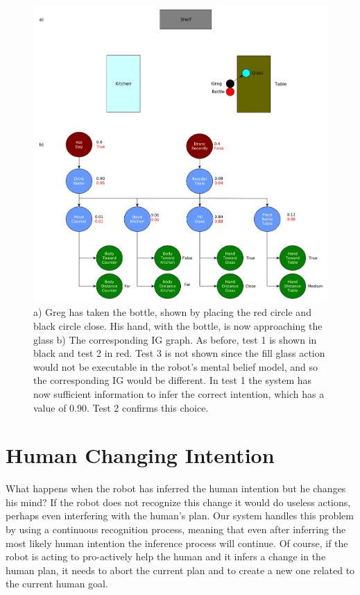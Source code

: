 \clearpage
 \begin{figure}[ht!]
	\centering
	\includegraphics[scale=0.4]{img/observer/ig_exp3.pdf}
	\caption[IG Example 3]{a) Greg has taken the bottle, shown by placing the red circle and black circle close. His hand, with the bottle, is now approaching the glass b) The corresponding IG graph. As before, test 1 is shown in black and test 2 in red. Test 3 is not shown since the fill glass action would not be executable in the robot's mental belief model, and so the corresponding IG would be different. In test 1 the system has now sufficient information to infer the correct intention, which has a value of 0.90. Test 2 confirms this choice.}
	\label{fig:intention-ig_exp3}
\end{figure}
\clearpage

\section{Human Changing Intention}
What happens when the robot has inferred the human intention but he changes his mind? If the robot does not recognize this change it would do useless actions, perhaps even interfering with the human's plan. Our system handles this problem by using a continuous recognition process, meaning that even after inferring the most likely human intention the inference process will continue. Of course, if the robot is acting to pro-actively help the human and it infers a change in the human plan, it needs to abort the current plan and to create a new one related to the current human goal. 

